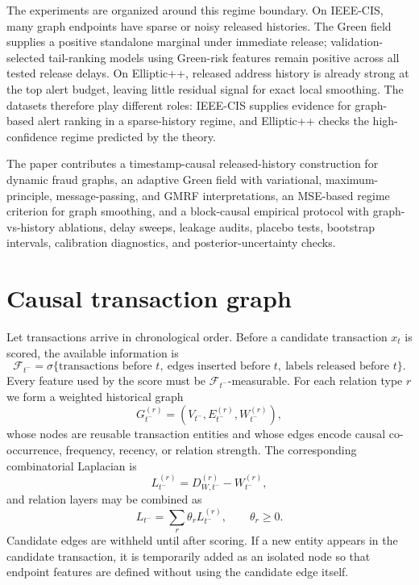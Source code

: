 \documentclass[11pt]{article}
\theoremstyle{definition}
\theoremstyle{remark}
\newcommand{\calF}{\mathcal{F}}
\begin{document}
The experiments are organized around this regime boundary. On IEEE-CIS, many graph endpoints have sparse or noisy released histories. The Green field supplies a positive standalone marginal under immediate release; validation-selected tail-ranking models using Green-risk features remain positive across all tested release delays. On Elliptic++, released address history is already strong at the top alert budget, leaving little residual signal for exact local smoothing. The datasets therefore play different roles: IEEE-CIS supplies evidence for graph-based alert ranking in a sparse-history regime, and Elliptic++ checks the high-confidence regime predicted by the theory.

The paper contributes a timestamp-causal released-history construction for dynamic fraud graphs, an adaptive Green field with variational, maximum-principle, message-passing, and GMRF interpretations, an MSE-based regime criterion for graph smoothing, and a block-causal empirical protocol with graph-vs-history ablations, delay sweeps, leakage audits, placebo tests, bootstrap intervals, calibration diagnostics, and posterior-uncertainty checks.

\section{Causal transaction graph}
\label{sec:causal-setting}

Let transactions arrive in chronological order. Before a candidate transaction $x_t$ is scored, the available information is
\[
    \calF_{t^-}=\sigma\{\text{transactions before }t,\ \text{edges inserted before }t,\ \text{labels released before }t\}.
\]
Every feature used by the score must be $\calF_{t^-}$-measurable. For each relation type $r$ we form a weighted historical graph
\[
    G_{t^-}^{(r)}=(V_{t^-},E_{t^-}^{(r)},W_{t^-}^{(r)}),
\]
whose nodes are reusable transaction entities and whose edges encode causal co-occurrence, frequency, recency, or relation strength. The corresponding combinatorial Laplacian is
\[
    L_{t^-}^{(r)}=D_{W,t^-}^{(r)}-W_{t^-}^{(r)},
\]
and relation layers may be combined as
\begin{equation}
    L_{t^-}=\sum_r \theta_r L_{t^-}^{(r)},\qquad \theta_r\ge 0.
    \label{eq:relation-layers}
\end{equation}
Candidate edges are withheld until after scoring. If a new entity appears in the candidate transaction, it is temporarily added as an isolated node so that endpoint features are defined without using the candidate edge itself.
\end{document}
